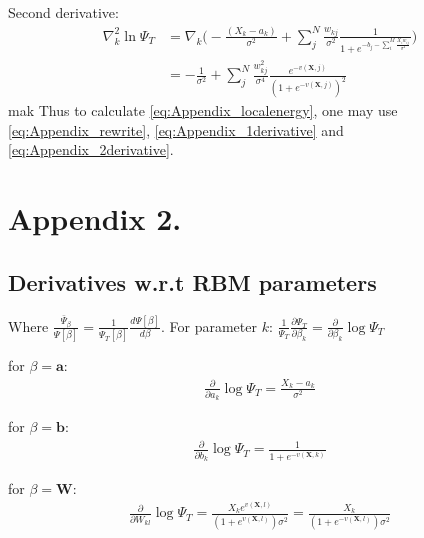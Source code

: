 \documentclass[%
oneside,                 %
final,                   %
10pt]{article}
\begin{document}
\begin{appendices}
Second derivative:
\begin{equation}
\begin{aligned}
\nabla_k^2  \ln \Psi_T &= \nabla_k  \big( 
   - \frac{(X_k - a_k)}{\sigma^2} + \sum_{j}^N \frac{w_{kj}}{\sigma^2}\frac{1}{1 + e^{-b_j  -\sum_i^M \frac{X_i w_{ij}}{\sigma^2}}}  \big) \\
  &=
 - \frac{1}{\sigma^2} + \sum_{j}^N \frac{w_{kj}^2}{\sigma^4}\frac{e^{-v(\bm X,j)}}{ ( 1 + e^{-v(\bm X,j)} )^2}  
\end{aligned}
\label{eq:Appendix_2derivative}
\end{equation}
mak
Thus to calculate \eqref{eq:Appendix_localenergy}, one may use \eqref{eq:Appendix_rewrite}, \eqref{eq:Appendix_1derivative} and \eqref{eq:Appendix_2derivative}.








\section{Appendix 2.} \label{APP_2}
\subsection{Derivatives w.r.t RBM parameters}
Where $\frac{\bar \Psi_{\beta}}{\Psi [\beta]} = \frac{1}{\Psi_T [\beta]}\frac{d \Psi[\beta]}{d \beta}$. For parameter $k$: $\frac{1}{\Psi_T}\frac{\partial \Psi_T}{\partial \beta_k}=\frac{\partial}{\partial \beta_k} \log \Psi_T$

for $\beta=\bm a$:
\begin{equation}
\begin{aligned}
\frac{\partial}{\partial a_k} \log \Psi_T = \frac{X_k-a_k}{\sigma^2}
\end{aligned}
\label{eq:Appendix2_grad_a}
\end{equation}

for $\beta=\bm b$:
\begin{equation}
\begin{aligned}
\frac{\partial}{\partial b_k} \log \Psi_T 
= 
  \frac{1}{1 + e^{-v(\bm X,k)}}
\end{aligned}
\label{eq:Appendix2_grad_b}
\end{equation}

for $\beta=\bm W$:
\begin{equation}
\begin{aligned}
\frac{\partial}{\partial W_{kl}} \log \Psi_T = 
  \frac{X_k e^{v(\bm X,l)} }{(1 + e^{v(\bm X,l)}) \sigma^2} =
  \frac{X_k} {(1 + e^{-v(\bm X,l)}) \sigma^2} 
\end{aligned}
\label{eq:Appendix2_grad_b}
\end{equation}
\end{appendices}
\end{document}
